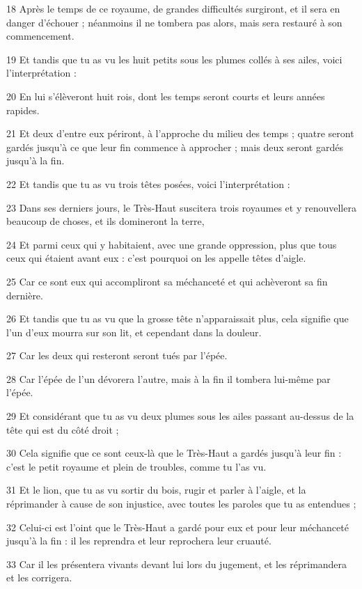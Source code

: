 \par 18 Après le temps de ce royaume, de grandes difficultés surgiront, et il sera en danger d'échouer ; néanmoins il ne tombera pas alors, mais sera restauré à son commencement.
\par 19 Et tandis que tu as vu les huit petits sous les plumes collés à ses ailes, voici l'interprétation :
\par 20 En lui s'élèveront huit rois, dont les temps seront courts et leurs années rapides.
\par 21 Et deux d'entre eux périront, à l'approche du milieu des temps ; quatre seront gardés jusqu'à ce que leur fin commence à approcher ; mais deux seront gardés jusqu'à la fin.
\par 22 Et tandis que tu as vu trois têtes posées, voici l'interprétation :
\par 23 Dans ses derniers jours, le Très-Haut suscitera trois royaumes et y renouvellera beaucoup de choses, et ils domineront la terre,
\par 24 Et parmi ceux qui y habitaient, avec une grande oppression, plus que tous ceux qui étaient avant eux : c'est pourquoi on les appelle têtes d'aigle.
\par 25 Car ce sont eux qui accompliront sa méchanceté et qui achèveront sa fin dernière.
\par 26 Et tandis que tu as vu que la grosse tête n'apparaissait plus, cela signifie que l'un d'eux mourra sur son lit, et cependant dans la douleur.
\par 27 Car les deux qui resteront seront tués par l'épée.
\par 28 Car l'épée de l'un dévorera l'autre, mais à la fin il tombera lui-même par l'épée.
\par 29 Et considérant que tu as vu deux plumes sous les ailes passant au-dessus de la tête qui est du côté droit ;
\par 30 Cela signifie que ce sont ceux-là que le Très-Haut a gardés jusqu'à leur fin : c'est le petit royaume et plein de troubles, comme tu l'as vu.
\par 31 Et le lion, que tu as vu sortir du bois, rugir et parler à l'aigle, et la réprimander à cause de son injustice, avec toutes les paroles que tu as entendues ;
\par 32 Celui-ci est l'oint que le Très-Haut a gardé pour eux et pour leur méchanceté jusqu'à la fin : il les reprendra et leur reprochera leur cruauté.
\par 33 Car il les présentera vivants devant lui lors du jugement, et les réprimandera et les corrigera.
